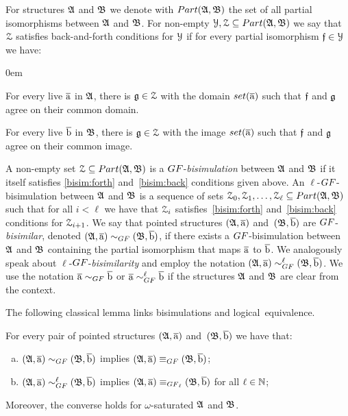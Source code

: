 For structures ${\mathfrak{A}}$ and ${\mathfrak{B}}$ we denote with $\PartIso{\str{A}}{\str{B}}$ the set of all partial isomorphisms between ${\mathfrak{A}}$ and ${\mathfrak{B}}$.
For non-empty $\bisimY, \bisimZ \subseteq \PartIso{\str{A}}{\str{B}}$ we say that $\mathcal{Z}$ satisfies back-and-forth conditions for $\mathcal{Y}$ if for every partial isomorphism $\mathfrak{f} \in \mathcal{Y}$ we have:
%
\begin{description}\itemsep0em
  \item[\desclabel{(Forth)}{bisim:forth}] For every live $\overline{\mathrm{a}}$ in ${\mathfrak{A}}$, there is $\mathfrak{g} \in \mathcal{Z}$ with the domain $\set(\elemtuplea)$ such that $\mathfrak{f}$ and $\mathfrak{g}$ agree on their common domain.
  \item[\desclabel{(Back)}{bisim:back}] For every live $\overline{\mathrm{b}}$ in ${\mathfrak{B}}$, there is $\mathfrak{g} \in \mathcal{Z}$ with the image $\set(\elemtuplea)$ such that $\mathfrak{f}$ and $\mathfrak{g}$ agree on their common image.
\end{description}
A non-empty set $\bisimZ \subseteq \PartIso{\str{A}}{\str{B}}$ is a $\GF$-\emph{bisimulation} between ${\mathfrak{A}}$ and ${\mathfrak{B}}$ if it itself satisfies \ref{bisim:forth} and~\ref{bisim:back} conditions given above.
An $\ell$-$\GF$-bisimulation between ${\mathfrak{A}}$ and ${\mathfrak{B}}$ is a sequence of sets $\bisimZ_0, \bisimZ_1, \ldots, \bisimZ_\ell \subseteq \PartIso{\str{A}}{\str{B}}$ such that for all $i < \ell$ we have that $\mathcal{Z}_i$ satisfies~\ref{bisim:forth} and~\ref{bisim:back} conditions for $\mathcal{Z}_{i{+}1}$.
We say that pointed structures $({\mathfrak{A}}, \overline{\mathrm{a}})$ and~$({\mathfrak{B}}, \overline{\mathrm{b}})$ are $\GF$-\emph{bisimilar}, denoted $(\str{A}, \elemtuplea) \bisimto_{\GF} (\str{B}, \elemtupleb)$, if there exists a $\GF$-bisimulation between ${\mathfrak{A}}$ and ${\mathfrak{B}}$ containing the partial isomorphism that maps $\overline{\mathrm{a}}$ to $\overline{\mathrm{b}}$.
We analogously speak about $\ell$-$\GF$-\emph{bisimilarity} and employ the notation $(\str{A}, \elemtuplea) \bisimto_{\GF}^{\ell} (\str{B}, \elemtupleb)$.
We use the notation $\elemtuplea \bisimto_{\GF} \elemtupleb$ or $\elemtuplea \bisimto_{\GF}^{\ell} \elemtupleb$ if the structures ${\mathfrak{A}}$ and ${\mathfrak{B}}$ are clear from the context.

The following classical lemma links bisimulations and logical~equivalence.
\begin{lemma}\label{lemma:GF-bisimulations-work-well}
For every pair of pointed structures $({\mathfrak{A}}, \overline{\mathrm{a}})$ and~$({\mathfrak{B}}, \overline{\mathrm{b}})$ we have that:
\begin{enumerate}[(a)]
\item $(\str{A}, \elemtuplea) \bisimto_{\GF} (\str{B}, \elemtupleb)$ implies $(\str{A}, \elemtuplea) \equiv_{\GF} (\str{B}, \elemtupleb)$;
\item $(\str{A}, \elemtuplea) \bisimto_{\GF}^{\ell} (\str{B}, \elemtupleb)$ implies $(\str{A}, \elemtuplea) \equiv_{\GF_\ell} (\str{B}, \elemtupleb)$ for all $\ell \in {\mathbb{N}}$;
\end{enumerate}
Moreover, the converse holds for $\omega$-saturated ${\mathfrak{A}}$ and ${\mathfrak{B}}$.
\end{lemma}


